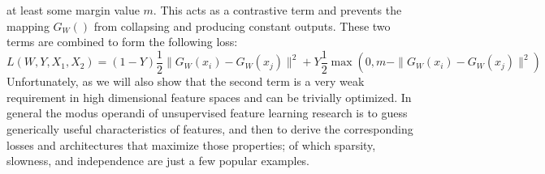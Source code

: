 at least some margin value $m$. This acts as a contrastive term and prevents 
the mapping $G_W()$ from collapsing and producing constant outputs. These two 
terms are combined to form the following loss:            
\begin{equation} 
L(W,Y,X_1,X_2) = (1-Y)\frac{1}{2}\|G_W(x_i)-G_W(x_j)\|^2 + Y \frac{1}{2}\max(0,m-\|G_W(x_i)-G_W(x_j)\|^2)  
\end{equation}  
Unfortunately, as we will also show that the second term is a very weak
requirement in high dimensional feature spaces and can be trivially 
optimized. 
\newline
\newline
\indent 
In general the modus operandi of unsupervised feature learning research is to guess 
generically useful characteristics of features, and then to derive the corresponding 
losses and architectures that maximize those properties; of which sparsity, slowness, 
and independence are just a few popular examples.      
